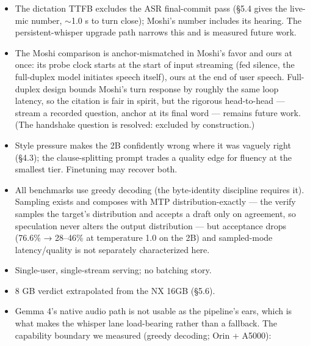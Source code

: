 \documentclass[journal]{IEEEtran}
\begin{document}
    \begin{itemize}
        \item The dictation TTFB excludes the ASR final-commit pass (§5.4 gives the live-mic number, $\sim$1.0 s to turn close); Moshi's number includes its hearing. The persistent-whisper upgrade path narrows this and is measured future work.
        \item The Moshi comparison is anchor-mismatched in Moshi's favor and ours at once: its probe clock starts at the start of input streaming (fed silence, the full-duplex model initiates speech itself), ours at the end of user speech. Full-duplex design bounds Moshi's turn response by roughly the same loop latency, so the citation is fair in spirit, but the rigorous head-to-head — stream a recorded question, anchor at its final word — remains future work. (The handshake question is resolved: excluded by construction.)
        \item Style pressure makes the 2B confidently wrong where it was vaguely right (§4.3); the clause-splitting prompt trades a quality edge for fluency at the smallest tier. Finetuning may recover both.
        \item All benchmarks use greedy decoding (the byte-identity discipline requires it). Sampling exists and composes with MTP distribution-exactly — the verify samples the target's distribution and accepts a draft only on agreement, so speculation never alters the output distribution — but acceptance drops (76.6\% → 28–46\% at temperature 1.0 on the 2B) and sampled-mode latency/quality is not separately characterized here.
        \item Single-user, single-stream serving; no batching story.
        \item 8 GB verdict extrapolated from the NX 16GB (§5.6).
        \item Gemma 4's native audio path is not usable as the pipeline's ears, which is what makes the whisper lane load-bearing rather than a fallback. The capability boundary we measured (greedy decoding; Orin + A5000):
    \end{itemize}
\end{document}
